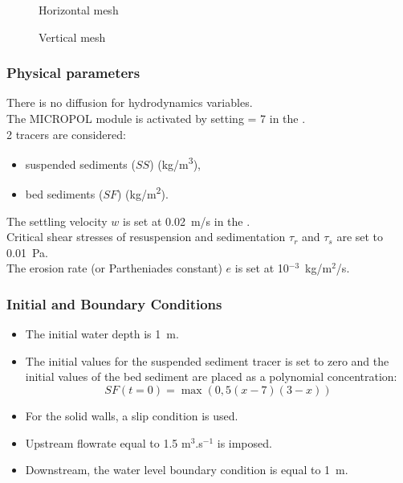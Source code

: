 \begin{figure}[H]
 \centering
\caption{Horizontal mesh}
 \label{fig:waq3d_micropol:mesh_bump}
\end{figure}

\begin{figure}[H]
 \centering
\caption{Vertical mesh}
 \label{fig:waq3d_micropol:mesh_bump_sec}
\end{figure}

\subsubsection{Physical parameters}
There is no diffusion for hydrodynamics variables.\\
The MICROPOL module is activated by setting  = 7
in the  .\\

2 tracers are considered:
\begin{itemize}
\item suspended sediments ($SS$) (kg/m\textsuperscript{3}),

\item bed sediments ($SF$) (kg/m\textsuperscript{2}).
\end{itemize}

The settling velocity $w$ is set at 0.02~m/s  in the \waqtel {}.\\
Critical shear stresses of resuspension and sedimentation $\tau_r$ and $\tau_s$ are set to 0.01~Pa.\\
The erosion rate (or Partheniades constant) $e$ is set at 10$^{-3}$~kg/m$^2$/s.


\subsubsection{Initial and Boundary Conditions}
\begin{itemize}
  
  \item The initial water depth is 1~m.
  \item The initial values for the suspended sediment tracer is set to zero and the initial values of the bed sediment are placed as a polynomial concentration:$$SF(t=0) = \max(0,5(x-7)(3-x))$$
  \item For the solid walls, a slip condition is used.
  \item Upstream flowrate equal to 1.5 m$^3$.s$^{-1}$ is imposed.
  \item Downstream, the water level boundary condition is equal to 1~m.
\end{itemize}

